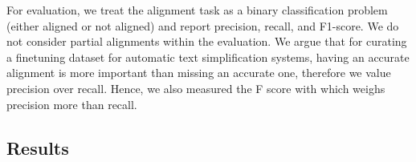\documentclass[11pt]{article}
\begin{document}
For evaluation, we treat the alignment task as a binary classification problem (either aligned or not aligned) and report precision, recall, and F1-score. We do not consider partial alignments within the evaluation. We argue that for curating a finetuning dataset for automatic text simplification systems, having an accurate alignment is more important than missing an accurate one, therefore we value precision over recall. Hence, we also measured the F score with  which weighs precision more than recall.

\begin{table}[htb]
\caption{Results of the alignment methods with : (upper part) and : capabilities (lower part) on sentence-pairs with : (n=1750, left part) and : alignments (n=991, right part).}

\label{alignment-methods-evaluation}
\end{table}


\subsection{Results}
\label{sec-deplain-sent-auto}
\end{document}
